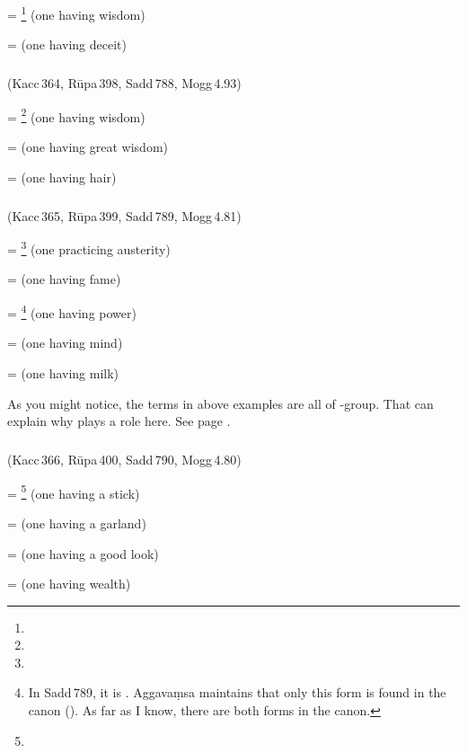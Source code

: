  = \footnote{} (one having wisdom) \par
{} =  (one having deceit) \par

\subparagraph*{} (Kacc\,364, R\=upa\,398, Sadd\,788, Mogg\,4.93)\label{pacct10:sa}

 = \footnote{} (one having wisdom) \par
{} =  (one having great wisdom) \par
{} =  (one having hair) \par

\subparagraph*{} (Kacc\,365, R\=upa\,399, Sadd\,789, Mogg\,4.81)\label{pacct10:sii}\label{pacct10:ssii}

 = \footnote{} (one practicing austerity) \par
{} =  (one having fame) \par
{} = \footnote{In Sadd\,789, it is . Aggava\d msa maintains that only this form is found in the canon (). As far as I know, there are both forms in the canon.} (one having power) \par
{} =  (one having mind) \par
{} =  (one having milk) \par

As you might notice, the terms in above examples are all of -group. That can explain why  plays a role here. See page \pageref{decl:mana}.

\subparagraph*{} (Kacc\,366, R\=upa\,400, Sadd\,790, Mogg\,4.80)\label{pacct10:ika}\label{pacct10:ii}

 = \footnote{} (one having a stick) \par
{} =  (one having a garland) \par
{} =  (one having a good look) \par
{} =  (one having wealth) \par

